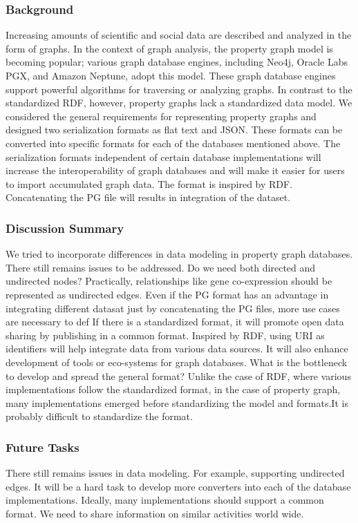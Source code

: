 \documentclass[runningheads]{llncs}
\begin{document}
\subsubsection{Background}
Increasing amounts of scientific and social data are described and analyzed in the form of graphs. In the context of graph analysis, the property graph model is becoming popular; various graph database engines, including Neo4j, Oracle Labs PGX, and Amazon Neptune, adopt this model. These graph database engines support powerful algorithms for traversing or analyzing graphs. In contrast to the standardized RDF, however, property graphs lack a standardized data model. We considered the general requirements for representing property graphs and designed two serialization formats as flat text and JSON.
These formats can be converted into specific formats for each of the databases mentioned above. The serialization formats independent of certain database implementations will increase the interoperability of graph databases and will make it easier for users to import accumulated graph data. The format is inspired by RDF. Concatenating the PG file will results in integration of the dataset.

\subsubsection{Discussion Summary}
We tried to incorporate differences in data modeling in property graph databases. There still remains issues to be addressed. Do we need both directed and undirected nodes? Practically, relationships like gene co-expression should be represented as undirected edges. 
Even if the PG format has an advantage in integrating different datasat just by concatenating the PG files, more use cases are necessary to def
If there is a standardized format, it will promote open data sharing by publishing in a common format. Inspired by RDF, using URI as identifiers will help integrate data from various data sources. It will also enhance development of tools or eco-systems for graph databases. What is the bottleneck to develop and spread the general format? Unlike the case of RDF, where various implementations follow the standardized format, in the case of property graph, many implementations emerged before standardizing the model and formats.It is probably difficult to standardize the format. 

\subsubsection{Future Tasks}
There still remains issues in data modeling. For example, supporting undirected edges. It will be a hard task to develop more converters into each of the database implementations. Ideally, many implementations should support a common format. We need to share information on similar activities world wide.
\end{document}
